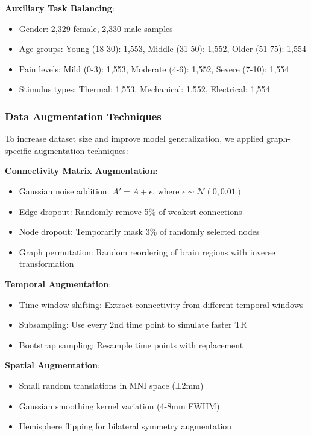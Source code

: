 \documentclass[10pt,journal,compsoc]{IEEEtran}
\begin{document}
\textbf{Auxiliary Task Balancing}:
\begin{itemize}
\item Gender: 2,329 female, 2,330 male samples
\item Age groups: Young (18-30): 1,553, Middle (31-50): 1,552, Older (51-75): 1,554
\item Pain levels: Mild (0-3): 1,553, Moderate (4-6): 1,552, Severe (7-10): 1,554
\item Stimulus types: Thermal: 1,553, Mechanical: 1,552, Electrical: 1,554
\end{itemize}

\subsubsection{Data Augmentation Techniques}

To increase dataset size and improve model generalization, we applied graph-specific augmentation techniques:

\textbf{Connectivity Matrix Augmentation}:
\begin{itemize}
\item Gaussian noise addition: $A' = A + \epsilon$, where $\epsilon \sim \mathcal{N}(0, 0.01)$
\item Edge dropout: Randomly remove 5\% of weakest connections
\item Node dropout: Temporarily mask 3\% of randomly selected nodes
\item Graph permutation: Random reordering of brain regions with inverse transformation
\end{itemize}

\textbf{Temporal Augmentation}:
\begin{itemize}
\item Time window shifting: Extract connectivity from different temporal windows
\item Subsampling: Use every 2nd time point to simulate faster TR
\item Bootstrap sampling: Resample time points with replacement
\end{itemize}

\textbf{Spatial Augmentation}:
\begin{itemize}
\item Small random translations in MNI space (±2mm)
\item Gaussian smoothing kernel variation (4-8mm FWHM)
\item Hemisphere flipping for bilateral symmetry augmentation
\end{itemize}
\end{document}

